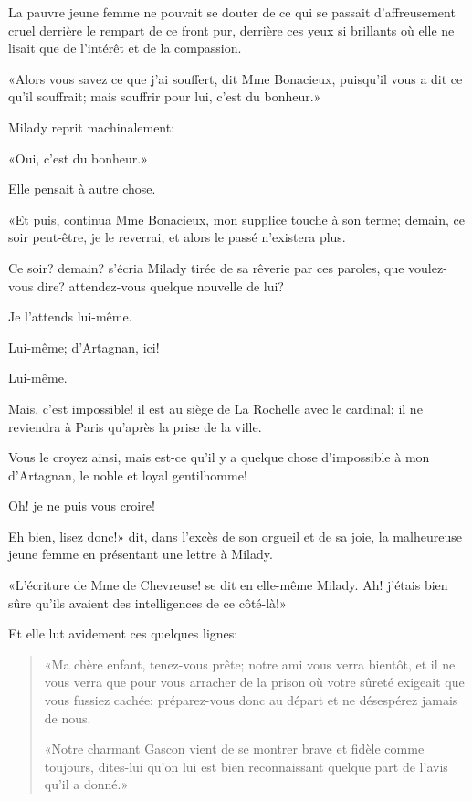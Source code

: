 La pauvre jeune femme ne pouvait se douter de ce qui se passait d'affreusement cruel derrière le rempart de ce front pur, derrière ces yeux si brillants où elle ne lisait que de l'intérêt et de la compassion. 

«Alors vous savez ce que j'ai souffert, dit Mme Bonacieux, puisqu'il vous a dit ce qu'il souffrait; mais souffrir pour lui, c'est du bonheur.» 

Milady reprit machinalement: 

«Oui, c'est du bonheur.» 

Elle pensait à autre chose. 

«Et puis, continua Mme Bonacieux, mon supplice touche à son terme; demain, ce soir peut-être, je le reverrai, et alors le passé n'existera plus. 

\speak  Ce soir? demain? s'écria Milady tirée de sa rêverie par ces paroles, que voulez-vous dire? attendez-vous quelque nouvelle de lui? 

\speak  Je l'attends lui-même. 

\speak  Lui-même; d'Artagnan, ici! 

\speak  Lui-même. 

\speak  Mais, c'est impossible! il est au siège de La Rochelle avec le cardinal; il ne reviendra à Paris qu'après la prise de la ville. 

\speak  Vous le croyez ainsi, mais est-ce qu'il y a quelque chose d'impossible à mon d'Artagnan, le noble et loyal gentilhomme! 

\speak  Oh! je ne puis vous croire! 

\speak  Eh bien, lisez donc!» dit, dans l'excès de son orgueil et de sa joie, la malheureuse jeune femme en présentant une lettre à Milady. 

«L'écriture de Mme de Chevreuse! se dit en elle-même Milady. Ah! j'étais bien sûre qu'ils avaient des intelligences de ce côté-là!» 

Et elle lut avidement ces quelques lignes:
\begin{quotation}
	«Ma chère enfant, tenez-vous prête; notre ami vous verra bientôt, et il ne vous verra que pour vous arracher de la prison où votre sûreté exigeait que vous fussiez cachée: préparez-vous donc au départ et ne désespérez jamais de nous.

«Notre charmant Gascon vient de se montrer brave et fidèle comme toujours, dites-lui qu'on lui est bien reconnaissant quelque part de l'avis qu'il a donné.» 
\end{quotation}


